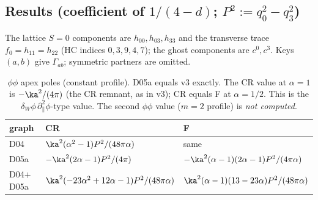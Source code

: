 \subsection{Results (coefficient of $1/(4-d)$; $P^2:=q_0^2-q_3^2$)}
The lattice $S=0$ components are $h_{00},h_{03},h_{33}$ and the transverse trace $f_0=h_{11}=h_{22}$ (HC indices $0,3,9,4,7$); the ghost components are $c^0,c^3$. Keys $(a,b)$ give $\Gamma_{ab}$; symmetric partners are omitted.

\begin{table}[h]\centering\small
\begin{tabular}{lll}\toprule
graph & CR & F\\\midrule
D04 & $\ka^2(\alpha^2-1)P^2/(48\pi\alpha)$ & same\\
D05a & $-\ka^2(2\alpha-1)P^2/(4\pi)$ & $-\ka^2(\alpha-1)(2\alpha-1)P^2/(4\pi\alpha)$\\
D04$+$D05a & $\ka^2(-23\alpha^2+12\alpha-1)P^2/(48\pi\alpha)$ & $\ka^2(\alpha-1)(13-23\alpha)P^2/(48\pi\alpha)$\\\bottomrule
\end{tabular}
\caption{$\phi\phi$ apex poles (constant profile). D05a equals v3 exactly. The CR value at $\alpha=1$ is $-\ka^2/(4\pi)$ (the CR remnant, as in v3); CR equals F at $\alpha=1/2$. This is the $\delta_W\phi\,\partial_\parallel^2\phi$-type value. The second $\phi\phi$ value ($m=2$ profile) is \emph{not computed}.}\label{tab:phi}
\end{table}

